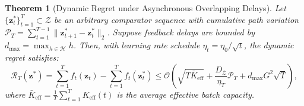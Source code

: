 \documentclass[10pt,journal,compsoc]{IEEEtran}
\newtheorem{theorem}{Theorem}
\begin{document}
\begin{theorem}[Dynamic Regret under Asynchronous Overlapping Delays]
\label{thm:dynamic_regret}
Let $\{\mathbf{z}_t^*\}_{t=1}^T \subset \mathcal{Z}$ be an arbitrary comparator sequence with cumulative path variation $\mathcal{P}_T = \sum_{t=1}^{T-1} \|\mathbf{z}_{t+1}^* - \mathbf{z}_t^*\|_2$. Suppose feedback delays are bounded by $d_{\max} = \max_{h \in \mathcal{H}} h$. Then, with learning rate schedule $\eta_t = \eta_0 / \sqrt{t}$, the dynamic regret satisfies:
\begin{equation}
\mathcal{R}_T(\mathbf{z}^*) = \sum_{t=1}^T f_t(\mathbf{z}_t) - \sum_{t=1}^T f_t(\mathbf{z}_t^*) \le \mathcal{O}\left( \sqrt{T \bar{K}_{\text{eff}}} + \frac{D_{\mathcal{Z}}}{\eta_T} \mathcal{P}_T + d_{\max} G^2 \sqrt{T} \right),
\end{equation}
where $\bar{K}_{\text{eff}} = \frac{1}{T} \sum_{t=1}^T K_{\text{eff}}(t)$ is the average effective batch capacity.
\end{theorem}
\end{document}
